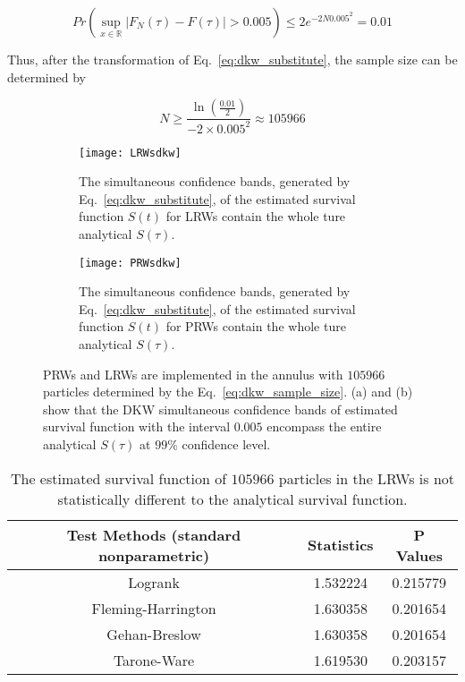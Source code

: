 \begin{equation}\label{eq:dkw_substitute}
  Pr(\sup_{x \in \mathbb{R}} |F_{N}(\tau) - F(\tau)| > 0.005) \leq 2e^{-2N0.005^2} = 0.01
\end{equation}

Thus, after the transformation of Eq.~\ref{eq:dkw_substitute}, the
sample size can be determined by

\begin{equation}\label{eq:dkw_sample_size}
  N \geq \frac{\ln(\frac{0.01}{2})}{-2 \times 0.005^2} \approx
  105966
\end{equation}


\begin{figure}
  \begin{subfigure}{0.9\textwidth}
    \centering
    \texttt{[image: LRWsdkw]}
    \caption{The simultaneous confidence bands, generated by
      Eq.~\ref{eq:dkw_substitute}, of the estimated survival function
      $S(t)$ for LRWs contain the whole ture analytical
      $S(\tau)$. \label{fig:dkw_lrws_analytical}}
  \end{subfigure}
  \begin{subfigure}{0.9\textwidth}
    \centering
    \texttt{[image: PRWsdkw]}
    \caption{The simultaneous confidence bands, generated by
      Eq.~\ref{eq:dkw_substitute}, of the estimated survival function
      $S(t)$ for PRWs contain the whole ture analytical
      $S(\tau)$. \label{fig:dkw_prws_analytical}}
  \end{subfigure}
  \caption{PRWs and LRWs are implemented in the annulus with $105966$
    particles determined by the Eq.~\ref{eq:dkw_sample_size}. (a) and
    (b) show that the DKW simultaneous confidence bands of estimated
    survival function with the interval $0.005$ encompass the entire
    analytical $S(\tau)$ at $99 \%$ confidence level. \label{fig:dkw_rw_analytical}}
\end{figure}

\begin{table}
  \centering
  \begin{tabular}{|c|c|c|}\hline
    Test Methods (standard nonparametric) & Statistics & P Values \\
    \hline
    Logrank & 1.532224 & 0.215779 \\
    \hline
    Fleming-Harrington & 1.630358 & 0.201654 \\
    \hline
    Gehan-Breslow & 1.630358 & 0.201654 \\
    \hline
    Tarone-Ware & 1.619530 & 0.203157 \\
    \hline
  \end{tabular}
  \caption{The estimated survival function of $105966$ particles in
    the LRWs is not statistically different to the analytical survival
    function.}
  \label{tab:two_sample_test_dkw_lrws_analytical}
\end{table}


